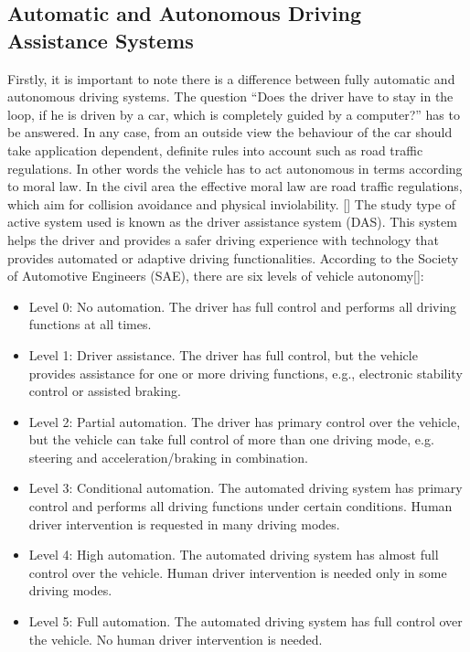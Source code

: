 \documentclass{article}
\begin{document}
\subsection{Automatic and Autonomous Driving Assistance Systems}

Firstly, it is important to note there is a difference between fully automatic and autonomous driving systems. The question “Does the driver have to stay in the loop, if he is driven by a car, which is completely guided by a computer?” has to be answered. In any case, from an outside view the behaviour of the car should take application dependent, definite rules into account such as road traffic regulations. In other words the vehicle has to act autonomous in terms according to moral law. In the civil area the effective moral law are road traffic regulations, which aim for collision avoidance and physical inviolability. [\textcite{horwick2010strategy}]
\bigbreak
The study type of active system used is known as the driver assistance system (DAS). This system helps the driver and provides a safer driving experience with technology that provides automated or adaptive driving functionalities. According to the Society of Automotive Engineers (SAE), there are six levels of vehicle autonomy[\textcite{curiel2019towards}]:
\bigbreak
\begin{itemize}
\item Level 0: No automation. The driver has full control and performs all driving functions at all times.

\item Level 1: Driver assistance. The driver has full control, but the vehicle provides assistance for one or more driving functions, e.g., electronic stability control or assisted braking.

\item Level 2: Partial automation. The driver has primary control over the vehicle, but the vehicle can take full control of more than one driving mode, e.g. steering and acceleration/braking in combination.

\item Level 3: Conditional automation. The automated driving system has primary control and performs all driving functions under certain conditions. Human driver intervention is requested in many driving modes.

\item Level 4: High automation. The automated driving system has almost full control over the vehicle. Human driver intervention is needed only in some driving modes.

\item Level 5: Full automation. The automated driving system has full control over the vehicle. No human driver intervention is needed.
\end{itemize}
\end{document}
